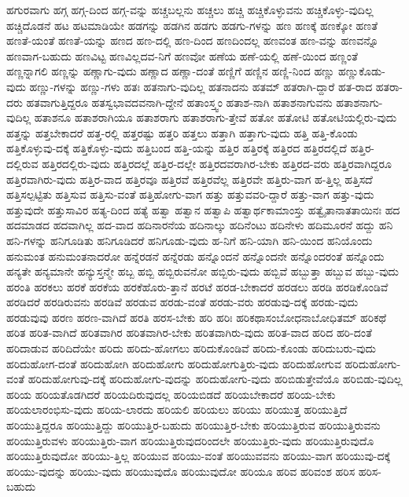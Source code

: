 {ಹಗುರವಾಗು
ಹಗ್ಗ
ಹಗ್ಗ-ದಿಂದ
ಹಗ್ಗ-ವನ್ನು
ಹಚ್ಚಬಲ್ಲನು
ಹಚ್ಚಲು
ಹಚ್ಚಿ
ಹಚ್ಚಿಕೊಳ್ಳುವನು
ಹಚ್ಚಿಕೊಳ್ಳು-ವುದಿಲ್ಲ
ಹಚ್ಚಿದೊಡನೆ
ಹಟ
ಹಟಮಾಡಿಯೇ
ಹಡಗನ್ನು
ಹಡಗಿನ
ಹಡಗು
ಹಡಗು-ಗಳನ್ನು
ಹಣ
ಹಣಕ್ಕೆ
ಹಣಕ್ಕೋ
ಹಣತೆ
ಹಣತೆ-ಯಂತೆ
ಹಣತೆ-ಯನ್ನು
ಹಣದ
ಹಣ-ದಲ್ಲಿ
ಹಣ-ದಿಂದ
ಹಣದಿಂದಲ್ಲ
ಹಣವಂತ
ಹಣ-ವನ್ನು
ಹಣವನ್ನೊ
ಹಣವಾಗ-ಬಹುದು
ಹಣವಿಟ್ಟ
ಹಣವಿಲ್ಲದವ-ನಿಗೆ
ಹಣವೋ
ಹಣೆಯ
ಹಣೆ-ಯಲ್ಲಿ
ಹಣೆ-ಯಿಂದ
ಹಣ್ಣಂತೆ
ಹಣ್ಣನ್ನಾಗಲಿ
ಹಣ್ಣನ್ನು
ಹಣ್ಣಾಗು-ವುದು
ಹಣ್ಣಾದ
ಹಣ್ಣಾ-ದಂತೆ
ಹಣ್ಣಿಗೆ
ಹಣ್ಣಿನ
ಹಣ್ಣಿ-ನಿಂದ
ಹಣ್ಣು
ಹಣ್ಣುಕೊಡು-ವುದು
ಹಣ್ಣು-ಗಳನ್ನು
ಹಣ್ಣು-ಗಳು
ಹತಃ
ಹತನಾಗು-ವುದಿಲ್ಲ
ಹತನಾದನು
ಹತಮ್
ಹತರಾಗಿ-ದ್ದಾರೆ
ಹತ-ರಾದ
ಹತರಾ-ದರು
ಹತವಾಗುತ್ತಿದ್ದರೂ
ಹತಸ್ವಭಾವದವನಾಗಿ-ದ್ದೇನೆ
ಹತಾಂಸ್ತ್ವಂ
ಹತಾಶ-ನಾಗಿ
ಹತಾಶನಾಗುವನು
ಹತಾಶನಾಗು-ವುದಿಲ್ಲ
ಹತಾಶನೂ
ಹತಾಶರಾಗಿಯೂ
ಹತಾಶರಾಗು
ಹತಾಶರಾಗು-ತ್ತೇವೆ
ಹತೋ
ಹತೋಟಿ
ಹತೋಟಿಯಲ್ಲಿರು-ವುದು
ಹತ್ತನ್ನು
ಹತ್ತಬೇಕಾದರೆ
ಹತ್ತ-ರಲ್ಲಿ
ಹತ್ತರಷ್ಟು
ಹತ್ತರಿ
ಹತ್ತಲು
ಹತ್ತಾಗಿ
ಹತ್ತಾಗು-ವುದು
ಹತ್ತಿ
ಹತ್ತಿ-ಕೊಂಡು
ಹತ್ತಿಕೊಳ್ಳುವು-ದಕ್ಕೆ
ಹತ್ತಿಕೊಳ್ಳು-ವುದು
ಹತ್ತಿಬಂದ
ಹತ್ತಿ-ಯನ್ನು
ಹತ್ತಿರ
ಹತ್ತಿರಕ್ಕೆ
ಹತ್ತಿರದ
ಹತ್ತಿರದಲ್ಲಿದೆ
ಹತ್ತಿರ-ದಲ್ಲಿರುವ
ಹತ್ತಿರದಲ್ಲಿರು-ವುದು
ಹತ್ತಿರದಲ್ಲೆ
ಹತ್ತಿರ-ದಲ್ಲೇ
ಹತ್ತಿರದವರಾಗಿರ-ಬೇಕು
ಹತ್ತಿರದ-ವರು
ಹತ್ತಿರವಾಗಿದ್ದರೂ
ಹತ್ತಿರವಾಗಿರು-ವುದು
ಹತ್ತಿರ-ವಾದ
ಹತ್ತಿರವೂ
ಹತ್ತಿರವೆ
ಹತ್ತಿರವೆಲ್ಲ
ಹತ್ತಿರವೇ
ಹತ್ತಿರು-ವಾಗ
ಹ-ತ್ತಿಲ್ಲ
ಹತ್ತಿಸದೆ
ಹತ್ತಿಸಲ್ಪಟ್ಟಿತು
ಹತ್ತಿಸುವ
ಹತ್ತಿಸು-ವಂತೆ
ಹತ್ತಿಹೋಗು-ವಾಗ
ಹತ್ತು
ಹತ್ತುವವರಿ-ದ್ದಾರೆ
ಹತ್ತು-ವಾಗ
ಹತ್ತು-ವುದು
ಹತ್ತುವುದೇ
ಹತ್ತುಸಾವಿರ
ಹತ್ಯ-ದಿಂದ
ಹತ್ಯೆ
ಹತ್ವಾ
ಹತ್ವಾನ
ಹತ್ವಾಪಿ
ಹತ್ವಾರ್ಥಕಾಮಾಂಸ್ತು
ಹತ್ವೈತಾನಾತತಾಯಿನಃ
ಹದ
ಹದಮಾಡದ
ಹದವಾಗಿಲ್ಲ
ಹದ-ವಾದ
ಹದಿನಾರನೆಯ
ಹದಿನಾಲ್ಕು
ಹದಿನೆಂಟು
ಹದಿನೇಳು
ಹದಿಮೂರನೆ
ಹದ್ದು
ಹನಿ
ಹನಿ-ಗಳನ್ನು
ಹನಿಗೂಡಿತು
ಹನಿಗೂಡಿದರೆ
ಹನಿಗೂಡು-ವುದು
ಹ-ನಿಗೆ
ಹನಿ-ಯಾಗಿ
ಹನಿ-ಯಿಂದ
ಹನಿಯೊಂದು
ಹನುಮಂತ
ಹನುಮಂತನಾದರೋ
ಹನ್ನೆರಡನೆ
ಹನ್ನೆರಡು
ಹನ್ನೊಂದನೆ
ಹನ್ನೊಂದನೇ
ಹನ್ನೊಂದರಂತೆ
ಹನ್ನೊಂದು
ಹನ್ಯತೇ
ಹನ್ಯಮಾನೇ
ಹನ್ಯುಸ್ತನ್ಮೇ
ಹಬ್ಬ
ಹಬ್ಬಿ
ಹಬ್ಬಿರುವನೋ
ಹಬ್ಬಿರು-ವುದು
ಹಬ್ಬಿವೆ
ಹಬ್ಬುತ್ತಾ
ಹಬ್ಬುವ
ಹಬ್ಬು-ವುದು
ಹರಂತಿ
ಹರಕಲು
ಹರಕೆ
ಹರಕೆಯ
ಹರಕೆಹೊರು-ತ್ತಾನೆ
ಹರಟೆ
ಹರಡ-ಬೇಕಾದರೆ
ಹರಡಲು
ಹರಡಿ
ಹರಡಿಕೊಂಡಿವೆ
ಹರಡಿದರೆ
ಹರಡಿರುವನು
ಹರಡಿವೆ
ಹರಡುವ
ಹರಡು-ವಂತೆ
ಹರಡು-ವರು
ಹರಡುವು-ದಕ್ಕೆ
ಹರಡು-ವುದು
ಹರಡುವುವು
ಹರಣ
ಹರಣ-ವಾಗಿದೆ
ಹರತಿ
ಹರಸ-ಬೇಕು
ಹರಿ
ಹರಿಃ
ಹರಿಕಥಾಸಂಬೋಧನಾಬೋಧಿತಮ್
ಹರಿಕಥೆ
ಹರಿತ
ಹರಿತ-ವಾಗಿದೆ
ಹರಿತವಾಗಿರ
ಹರಿತವಾಗಿರ-ಬೇಕು
ಹರಿತವಾಗಿರು-ವುದು
ಹರಿತ-ವಾದ
ಹರಿದ
ಹರಿ-ದಂತೆ
ಹರಿದಾಡುವ
ಹರಿದಿದೆಯೇ
ಹರಿದು
ಹರಿದು-ಹೋಗಲು
ಹರಿದುಕೊಂಡಿವೆ
ಹರಿದು-ಕೊಂಡು
ಹರಿದುಬರು-ವುದು
ಹರಿದುಹೋಗ-ದಂತೆ
ಹರಿದುಹೋಗಿ
ಹರಿದುಹೋಗು
ಹರಿದುಹೋಗುತ್ತಿರು-ವುದು
ಹರಿದುಹೋಗುವ
ಹರಿದುಹೋಗು-ವಂತೆ
ಹರಿದುಹೋಗುವು-ದಕ್ಕೆ
ಹರಿದುಹೋಗು-ವುದನ್ನು
ಹರಿದುಹೋಗು-ವುದು
ಹರಿಬಿಡುತ್ತೇವೆಯೊ
ಹರಿಬಿಡು-ವುದಿಲ್ಲ
ಹರಿಯ
ಹರಿಯತೊಡಗಿದರೆ
ಹರಿಯದಿರುವುದಲ್ಲ
ಹರಿಯಬಿಡದೆ
ಹರಿಯಬೇಕಾದರೆ
ಹರಿಯ-ಬೇಕು
ಹರಿಯಲಾರಂಭಿಸು-ವುದು
ಹರಿಯ-ಲಾರದು
ಹರಿಯಲಿ
ಹರಿಯಲು
ಹರಿಯು
ಹರಿಯುತ್ತ
ಹರಿಯುತ್ತಿದೆ
ಹರಿಯುತ್ತಿದ್ದರೂ
ಹರಿಯುತ್ತಿದ್ದು
ಹರಿಯುತ್ತಿರ-ಬಹುದು
ಹರಿಯುತ್ತಿರ-ಬೇಕು
ಹರಿಯುತ್ತಿರುವ
ಹರಿಯುತ್ತಿರುವನು
ಹರಿಯುತ್ತಿರುವಳು
ಹರಿಯುತ್ತಿರು-ವಾಗ
ಹರಿಯುತ್ತಿರುವುದರಿಂದಲೇ
ಹರಿಯುತ್ತಿರು-ವುದು
ಹರಿಯುತ್ತಿರುವುದೊ
ಹರಿಯುತ್ತಿರುವುದೋ
ಹರಿಯು-ತ್ತಿಲ್ಲ
ಹರಿಯುವ
ಹರಿಯು-ವಂತೆ
ಹರಿಯುವವನು
ಹರಿಯು-ವಾಗ
ಹರಿಯುವು-ದಕ್ಕೆ
ಹರಿಯು-ವುದನ್ನು
ಹರಿಯು-ವುದು
ಹರಿಯುವುದೊ
ಹರಿಯುವುದೋ
ಹರಿಯೂ
ಹರಿವ
ಹರಿವಂಶ
ಹರಿಸ
ಹರಿಸ-ಬಹುದು
}
